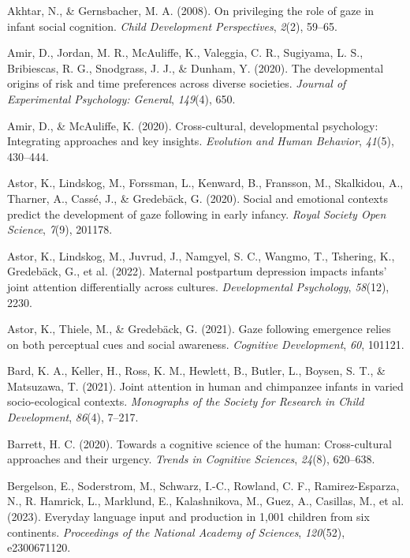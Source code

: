 \documentclass[
  man,floatsintext]{apa7}
\newlength{\cslhangindent}
\newenvironment{CSLReferences}[2] %
 {\begin{list}{}{%
  \setlength{\itemindent}{0pt}
  \setlength{\leftmargin}{0pt}
  \setlength{\parsep}{0pt}
  \ifodd #1
   \setlength{\leftmargin}{\cslhangindent}
   \setlength{\itemindent}{-1\cslhangindent}
  \fi
  \setlength{\itemsep}{#2\baselineskip}}}
 {\end{list}}
\begin{document}
\label{refs}
\begin{CSLReferences}{1}{0}
Akhtar, N., \& Gernsbacher, M. A. (2008). On privileging the role of gaze in infant social cognition. \emph{Child Development Perspectives}, \emph{2}(2), 59--65.

Amir, D., Jordan, M. R., McAuliffe, K., Valeggia, C. R., Sugiyama, L. S., Bribiescas, R. G., Snodgrass, J. J., \& Dunham, Y. (2020). The developmental origins of risk and time preferences across diverse societies. \emph{Journal of Experimental Psychology: General}, \emph{149}(4), 650.

Amir, D., \& McAuliffe, K. (2020). Cross-cultural, developmental psychology: Integrating approaches and key insights. \emph{Evolution and Human Behavior}, \emph{41}(5), 430--444.

Astor, K., Lindskog, M., Forssman, L., Kenward, B., Fransson, M., Skalkidou, A., Tharner, A., Cassé, J., \& Gredebäck, G. (2020). Social and emotional contexts predict the development of gaze following in early infancy. \emph{Royal Society Open Science}, \emph{7}(9), 201178.

Astor, K., Lindskog, M., Juvrud, J., Namgyel, S. C., Wangmo, T., Tshering, K., Gredebäck, G., et al. (2022). Maternal postpartum depression impacts infants' joint attention differentially across cultures. \emph{Developmental Psychology}, \emph{58}(12), 2230.

Astor, K., Thiele, M., \& Gredebäck, G. (2021). Gaze following emergence relies on both perceptual cues and social awareness. \emph{Cognitive Development}, \emph{60}, 101121.

Bard, K. A., Keller, H., Ross, K. M., Hewlett, B., Butler, L., Boysen, S. T., \& Matsuzawa, T. (2021). Joint attention in human and chimpanzee infants in varied socio-ecological contexts. \emph{Monographs of the Society for Research in Child Development}, \emph{86}(4), 7--217.

Barrett, H. C. (2020). Towards a cognitive science of the human: Cross-cultural approaches and their urgency. \emph{Trends in Cognitive Sciences}, \emph{24}(8), 620--638.

Bergelson, E., Soderstrom, M., Schwarz, I.-C., Rowland, C. F., Ramirez-Esparza, N., R. Hamrick, L., Marklund, E., Kalashnikova, M., Guez, A., Casillas, M., et al. (2023). Everyday language input and production in 1,001 children from six continents. \emph{Proceedings of the National Academy of Sciences}, \emph{120}(52), e2300671120.


\end{CSLReferences}
\end{document}
